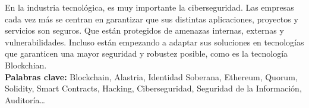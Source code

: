 
En la industria tecnológica, es muy importante la ciberseguridad. Las empresas cada vez más se centran en garantizar que sus distintas aplicaciones, proyectos y servicios son seguros. Que están protegidos de amenazas internas, externas y vulnerabilidades. Incluso están empezando a adaptar sus soluciones en tecnologías que garanticen una mayor seguridad y robustez posible, como es la tecnología Blockchian.\\

\textbf{Palabras clave:} Blockchain, Alastria, Identidad Soberana, Ethereum, Quorum, Solidity, Smart Contracts, Hacking, Ciberseguridad, Seguridad de la Información, Auditoría\ldots


